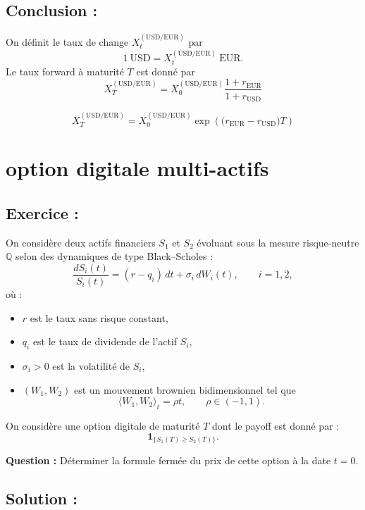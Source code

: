\subsection*{Conclusion :}
On définit le taux de change $X_t^{(\text{USD/EUR})}$ par
\[
1~\text{USD} = X_t^{(\text{USD/EUR})}~\text{EUR}.
\]
Le taux forward à maturité $T$ est donné par
\[
\boxed{
X_T^{(\text{USD/EUR})}
=
X_0^{(\text{USD/EUR})}
\frac{1+r_{\text{EUR}}}{1+r_{\text{USD}}}
}
\]

\[
\boxed{
X_T^{(\text{USD/EUR})}
=
X_0^{(\text{USD/EUR})}
\exp\!\left(
\bigl(r_{\text{EUR}} - r_{\text{USD}}\bigr)T
\right)
}
\]


\section{option digitale multi-actifs}



\subsection*{Exercice : }

\begin{exerciseBox}
On considère deux actifs financiers $S_1$ et $S_2$ évoluant sous la mesure risque-neutre $\mathbb{Q}$ selon des dynamiques de type Black--Scholes :
\[
\frac{dS_i(t)}{S_i(t)} = (r - q_i)\,dt + \sigma_i\,dW_i(t),
\qquad i = 1,2,
\]
où :
\begin{itemize}
  \item $r$ est le taux sans risque constant,
  \item $q_i$ est le taux de dividende de l’actif $S_i$,
  \item $\sigma_i > 0$ est la volatilité de $S_i$,
  \item $(W_1, W_2)$ est un mouvement brownien bidimensionnel tel que
  \[
  \langle W_1, W_2 \rangle_t = \rho t, \qquad \rho \in (-1,1).
  \]
\end{itemize}

On considère une option digitale de maturité $T$ dont le payoff est donné par :
\[
\mathbf{1}_{\{ S_1(T) \ge S_2(T) \}}.
\]

\medskip

\noindent
\textbf{Question :} Déterminer la formule fermée du prix de cette option à la date $t=0$.
\end{exerciseBox}

\subsection*{Solution :}

